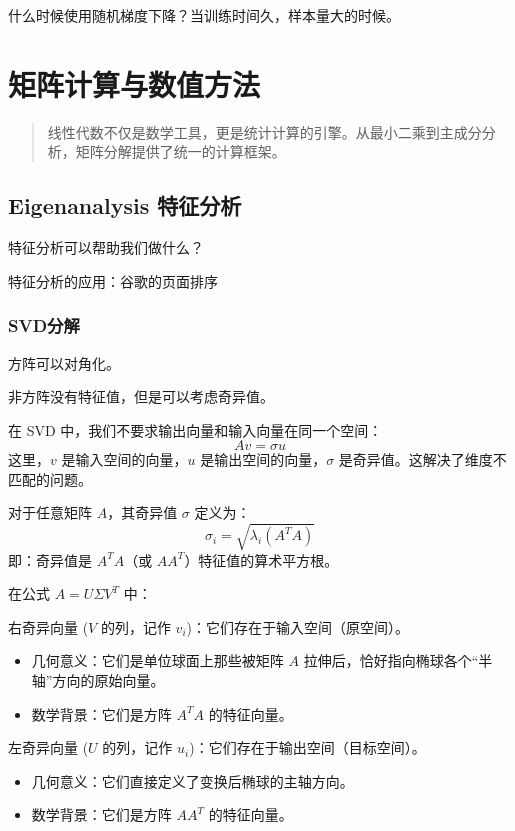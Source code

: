 \documentclass[
]{book}
\begin{document}
什么时候使用随机梯度下降？当训练时间久，样本量大的时候。

\chapter{矩阵计算与数值方法}\label{ux77e9ux9635ux8ba1ux7b97ux4e0eux6570ux503cux65b9ux6cd5}

\begin{quote}
线性代数不仅是数学工具，更是统计计算的引擎。从最小二乘到主成分分析，矩阵分解提供了统一的计算框架。
\end{quote}

\section{Eigenanalysis 特征分析}\label{eigenanalysis-ux7279ux5f81ux5206ux6790}

特征分析可以帮助我们做什么？

特征分析的应用：谷歌的页面排序

\subsection{SVD分解}\label{svdux5206ux89e3}

方阵可以对角化。

非方阵没有特征值，但是可以考虑奇异值。

在 SVD 中，我们不要求输出向量和输入向量在同一个空间：\[Av = \sigma u\]这里，\(v\) 是输入空间的向量，\(u\) 是输出空间的向量，\(\sigma\) 是奇异值。这解决了维度不匹配的问题。

对于任意矩阵 \(A\)，其奇异值 \(\sigma\) 定义为：\[\sigma_i = \sqrt{\lambda_i(A^T A)}\]即：奇异值是 \(A^T A\)（或 \(AA^T\)）特征值的算术平方根。

在公式 \(A = U \Sigma V^T\) 中：

右奇异向量 (\(V\) 的列，记作 \(v_i\))：它们存在于输入空间（原空间）。

\begin{itemize}
\item
  几何意义：它们是单位球面上那些被矩阵 \(A\) 拉伸后，恰好指向椭球各个``半轴''方向的原始向量。
\item
  数学背景：它们是方阵 \(A^T A\) 的特征向量。
\end{itemize}

左奇异向量 (\(U\) 的列，记作 \(u_i\))：它们存在于输出空间（目标空间）。

\begin{itemize}
\item
  几何意义：它们直接定义了变换后椭球的主轴方向。
\item
  数学背景：它们是方阵 \(AA^T\) 的特征向量。
\end{itemize}
\end{document}
